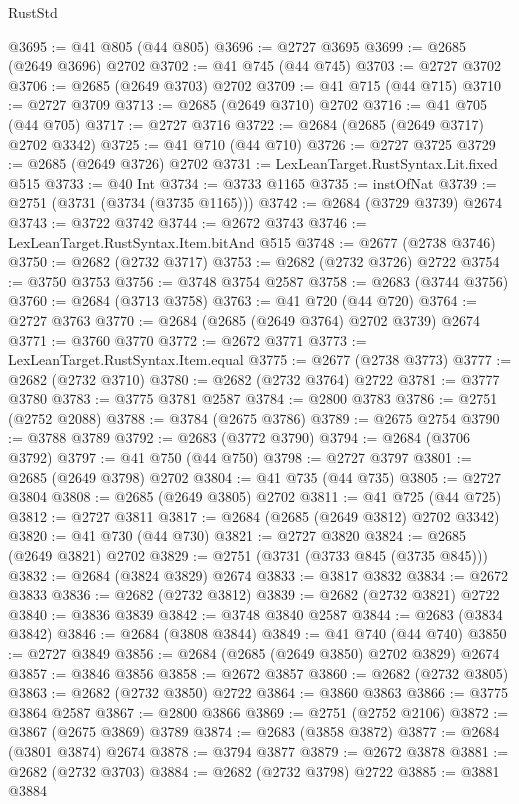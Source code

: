 \begin{lexlean}{RustStd}
\begin{coremodule}
{\begin{coremodule}
{{{{{{{{{{{{{{{{{{{{{{{{{{@3695 := @41 @805 (@44 @805)
@3696 := @2727 @3695
@3699 := @2685 (@2649 @3696) @2702
@3702 := @41 @745 (@44 @745)
@3703 := @2727 @3702
@3706 := @2685 (@2649 @3703) @2702
@3709 := @41 @715 (@44 @715)
@3710 := @2727 @3709
@3713 := @2685 (@2649 @3710) @2702
@3716 := @41 @705 (@44 @705)
@3717 := @2727 @3716
@3722 := @2684 (@2685 (@2649 @3717) @2702 @3342)
@3725 := @41 @710 (@44 @710)
@3726 := @2727 @3725
@3729 := @2685 (@2649 @3726) @2702
@3731 := LexLeanTarget.RustSyntax.Lit.fixed @515
@3733 := @40 Int
@3734 := @3733 @1165
@3735 := instOfNat
@3739 := @2751 (@3731 (@3734 (@3735 @1165)))
@3742 := @2684 (@3729 @3739) @2674
@3743 := @3722 @3742
@3744 := @2672 @3743
@3746 := LexLeanTarget.RustSyntax.Item.bitAnd @515
@3748 := @2677 (@2738 @3746)
@3750 := @2682 (@2732 @3717)
@3753 := @2682 (@2732 @3726) @2722
@3754 := @3750 @3753
@3756 := @3748 @3754 @2587
@3758 := @2683 (@3744 @3756)
@3760 := @2684 (@3713 @3758)
@3763 := @41 @720 (@44 @720)
@3764 := @2727 @3763
@3770 := @2684 (@2685 (@2649 @3764) @2702 @3739) @2674
@3771 := @3760 @3770
@3772 := @2672 @3771
@3773 := LexLeanTarget.RustSyntax.Item.equal
@3775 := @2677 (@2738 @3773)
@3777 := @2682 (@2732 @3710)
@3780 := @2682 (@2732 @3764) @2722
@3781 := @3777 @3780
@3783 := @3775 @3781 @2587
@3784 := @2800 @3783
@3786 := @2751 (@2752 @2088)
@3788 := @3784 (@2675 @3786)
@3789 := @2675 @2754
@3790 := @3788 @3789
@3792 := @2683 (@3772 @3790)
@3794 := @2684 (@3706 @3792)
@3797 := @41 @750 (@44 @750)
@3798 := @2727 @3797
@3801 := @2685 (@2649 @3798) @2702
@3804 := @41 @735 (@44 @735)
@3805 := @2727 @3804
@3808 := @2685 (@2649 @3805) @2702
@3811 := @41 @725 (@44 @725)
@3812 := @2727 @3811
@3817 := @2684 (@2685 (@2649 @3812) @2702 @3342)
@3820 := @41 @730 (@44 @730)
@3821 := @2727 @3820
@3824 := @2685 (@2649 @3821) @2702
@3829 := @2751 (@3731 (@3733 @845 (@3735 @845)))
@3832 := @2684 (@3824 @3829) @2674
@3833 := @3817 @3832
@3834 := @2672 @3833
@3836 := @2682 (@2732 @3812)
@3839 := @2682 (@2732 @3821) @2722
@3840 := @3836 @3839
@3842 := @3748 @3840 @2587
@3844 := @2683 (@3834 @3842)
@3846 := @2684 (@3808 @3844)
@3849 := @41 @740 (@44 @740)
@3850 := @2727 @3849
@3856 := @2684 (@2685 (@2649 @3850) @2702 @3829) @2674
@3857 := @3846 @3856
@3858 := @2672 @3857
@3860 := @2682 (@2732 @3805)
@3863 := @2682 (@2732 @3850) @2722
@3864 := @3860 @3863
@3866 := @3775 @3864 @2587
@3867 := @2800 @3866
@3869 := @2751 (@2752 @2106)
@3872 := @3867 (@2675 @3869) @3789
@3874 := @2683 (@3858 @3872)
@3877 := @2684 (@3801 @3874) @2674
@3878 := @3794 @3877
@3879 := @2672 @3878
@3881 := @2682 (@2732 @3703)
@3884 := @2682 (@2732 @3798) @2722
@3885 := @3881 @3884
}}}}}}}}}}}}}}}}}}}}}}}}}}
\end{coremodule}}
\end{coremodule}
\end{lexlean}

